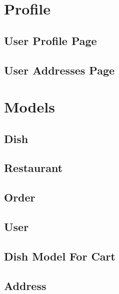 \section{Profile}
\subsection{User Profile Page}

\subsection{User Addresses Page}

\section{Models}
\subsection{Dish}

\subsection{Restaurant}

\subsection{Order}

\subsection{User}

\subsection{Dish Model For Cart}

\subsection{Address}

